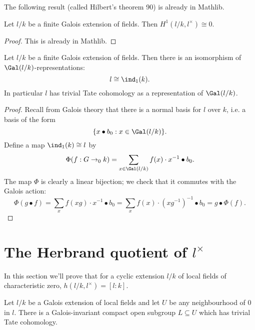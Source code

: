 The following result (called Hilbert's theorem 90) is already in Mathlib.

\begin{theorem}\label{thm:hilbert 90}
	\mathlibok
	Let $l/k$ be a finite Galois extension of fields.
	Then $H^1(l/k, l^\times) \cong 0$.
\end{theorem}

\begin{proof}
	\mathlibok
	This is already in Mathlib.
\end{proof}

\begin{theorem}\label{thm:additive field trivial}
	\leanok
	Let $l/k$ be a finite Galois extension of fields.
	Then there is an isomorphism of $\Gal(l/k)$-representations:
	\[
		l \cong \ind_1(k).
	\]
	In particular $l$ has trivial Tate cohomology as a representation of $\Gal(l/k)$.
\end{theorem}

\begin{proof}
	\leanok
	Recall from Galois theory that there is a normal basis for $l$ over $k$, i.e. a basis of the
	form
	\[
		\{x \bullet b_0 : x \in \Gal(l/k)\}.
	\]
	Define a map $\ind_1(k) \cong l$ by
	\[
		\Phi (f : G \to_0 k) = \sum_{x \in \Gal(l/k)} f(x) \cdot x^{-1} \bullet b_0.
	\]
	The map $\Phi$ is clearly a linear bijection;
	we check that it commutes with the Galois action:
	\[
		\Phi(g\bullet f)
		= \sum_x f(xg) \cdot x^{-1} \bullet b_0
		= \sum_x f(x) \cdot (xg^{-1})^{-1} \bullet b_0
		= g \bullet \Phi(f).
	\]
\end{proof}






\section{The Herbrand quotient of \texorpdfstring{$l^{\times}$}{l*}}

In this section we'll prove that for a cyclic extension $l/k$
of local fields of characteristic zero,
$h(l/k,l^\times) = [l:k]$.

\begin{lemma}
	\label{lem:exists additive trivial}
	Let $l/k$ be a Galois extension of local fields and
	let $U$ be any neighbourhood of $0$ in $l$.
	There is a Galois-invariant compact open subgroup $L \subseteq U$
	which has trivial Tate cohomology.
\end{lemma}

